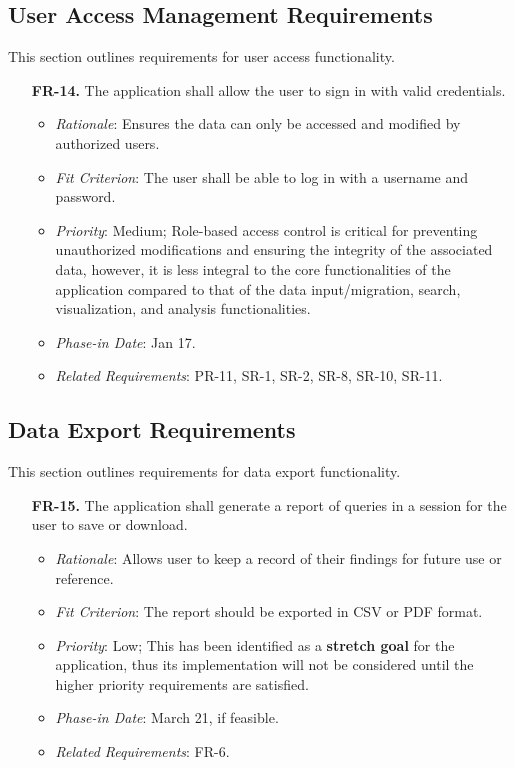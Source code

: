 \documentclass[12pt]{article}
\begin{document}
\subsection{User Access Management Requirements}
This section outlines requirements for user access functionality.
\begin{enumerate}
  \item[\textbf{FR-14.}] The application shall allow the user to sign in with valid credentials.
  \begin{itemize}
    \item \textit{Rationale}: Ensures the data can only be accessed and modified by authorized users.
    \item \textit{Fit Criterion}: The user shall be able to log in with a username and password.
    \item \textit{Priority}: Medium; Role-based access control is critical for
    preventing unauthorized modifications and ensuring the integrity of the
    associated data, however, it is less integral to the core functionalities of
    the application compared to that of the data input/migration, search,
    visualization, and analysis functionalities.
    \item \textit{Phase-in Date}: Jan 17.
    \item \textit{Related Requirements}: PR-11, SR-1, SR-2, SR-8, SR-10, SR-11.
  \end{itemize}
\end{enumerate}

\subsection{Data Export Requirements}
This section outlines requirements for data export functionality.
\begin{enumerate}
  \item[\textbf{FR-15.}] The application shall generate a report of queries in a session for the user to save or download.
  \begin{itemize}
    \item \textit{Rationale}: Allows user to keep a record of their findings for future use or reference.
    \item \textit{Fit Criterion}: The report should be exported in CSV or PDF format.
    \item \textit{Priority}: Low; This has been identified as a \textbf{stretch goal} for
    the application, thus its implementation will not be considered until the
    higher priority requirements are satisfied.
    \item \textit{Phase-in Date}: March 21, if feasible.
    \item \textit{Related Requirements}: FR-6.
  \end{itemize}
\end{enumerate}
\end{document}
